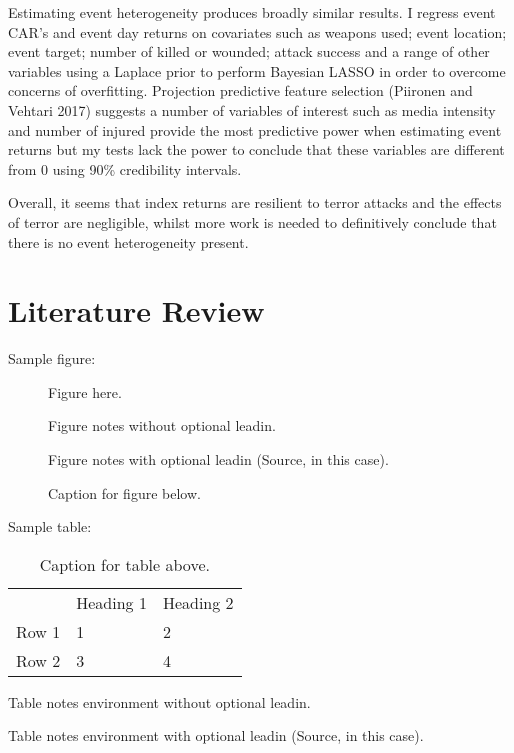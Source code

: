 \documentclass[]{AEA}
\begin{document}
Estimating event heterogeneity produces broadly similar results. I
regress event CAR's and event day returns on covariates such as weapons
used; event location; event target; number of killed or wounded; attack
success and a range of other variables using a Laplace prior to perform
Bayesian LASSO in order to overcome concerns of overfitting. Projection
predictive feature selection (Piironen and Vehtari 2017) suggests a
number of variables of interest such as media intensity and number of
injured provide the most predictive power when estimating event returns
but my tests lack the power to conclude that these variables are
different from 0 using 90\% credibility intervals.

Overall, it seems that index returns are resilient to terror attacks and
the effects of terror are negligible, whilst more work is needed to
definitively conclude that there is no event heterogeneity present.

\section{Literature Review}

Sample figure:

\begin{figure}
Figure here.

\caption{Caption for figure below.}
\begin{figurenotes}
Figure notes without optional leadin.
\end{figurenotes}
\begin{figurenotes}[Source]
Figure notes with optional leadin (Source, in this case).
\end{figurenotes}
\end{figure}

Sample table:

\begin{table}
\caption{Caption for table above.}

\begin{tabular}{lll}
& Heading 1 & Heading 2 \\
Row 1 & 1 & 2 \\
Row 2 & 3 & 4%
\end{tabular}
\begin{tablenotes}
Table notes environment without optional leadin.
\end{tablenotes}
\begin{tablenotes}[Source]
Table notes environment with optional leadin (Source, in this case).
\end{tablenotes}
\end{table}
\end{document}
